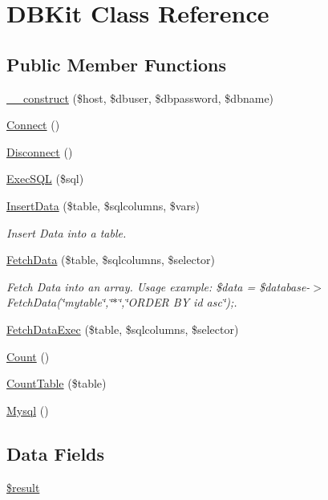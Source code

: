 \hypertarget{class_d_b_kit}{\section{D\-B\-Kit Class Reference}
\label{class_d_b_kit}
}
\subsection*{Public Member Functions}
\begin{DoxyCompactItemize}
\item 
\hyperlink{class_d_b_kit_a478255538264e212fe5a3924d69e34a6}{\-\_\-\-\_\-construct} (\$host, \$dbuser, \$dbpassword, \$dbname)
\item 
\hyperlink{class_d_b_kit_a9ac768272a054d6ef7e8436f1144b730}{Connect} ()
\item 
\hyperlink{class_d_b_kit_aec617d8b732c15e5d5be216fee2b9bf5}{Disconnect} ()
\item 
\hyperlink{class_d_b_kit_abe57042ceda608005904adcbf3a03ce1}{Exec\-S\-Q\-L} (\$sql)
\item 
\hyperlink{class_d_b_kit_ab8ad12e8a3f2fed48c7e6974e58f6dcd}{Insert\-Data} (\$table, \$sqlcolumns, \$vars)
\begin{DoxyCompactList}\small\item\em Insert Data into a table. \end{DoxyCompactList}\item 
\hyperlink{class_d_b_kit_a3858bee81ad39a80260c2fc0989ba358}{Fetch\-Data} (\$table, \$sqlcolumns, \$selector)
\begin{DoxyCompactList}\small\item\em Fetch Data into an array. Usage example\-: \$data = \$database-\/$>$Fetch\-Data(\char`\"{}mytable\char`\"{},\char`\"{}$\ast$\char`\"{},\char`\"{}\-O\-R\-D\-E\-R B\-Y id asc\char`\"{});. \end{DoxyCompactList}\item 
\hyperlink{class_d_b_kit_ab2b1c845fbe54b7e22f1ff5901f6c6ce}{Fetch\-Data\-Exec} (\$table, \$sqlcolumns, \$selector)
\item 
\hyperlink{class_d_b_kit_a6de0c2e86c373f77c8833ba52b3f76ce}{Count} ()
\item 
\hyperlink{class_d_b_kit_a6c1483f522f804c83535542ab5938553}{Count\-Table} (\$table)
\item 
\hyperlink{class_d_b_kit_a8daccf2bdab13873d4cdeaf349027bc8}{Mysql} ()
\end{DoxyCompactItemize}
\subsection*{Data Fields}
\begin{DoxyCompactItemize}
\item 
\hyperlink{class_d_b_kit_a112ef069ddc0454086e3d1e6d8d55d07}{\$result}
\end{DoxyCompactItemize}


